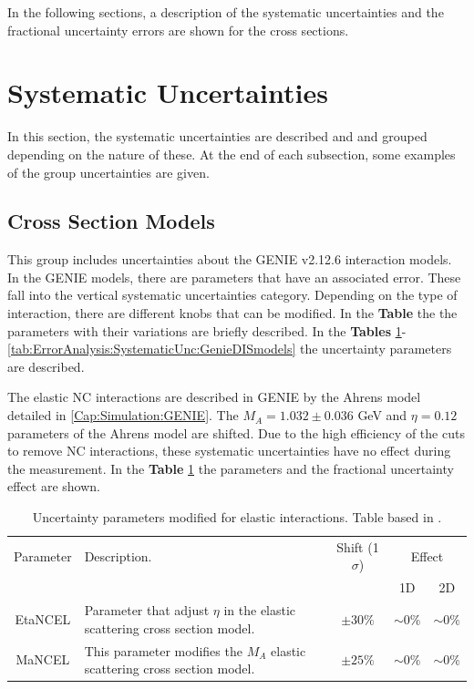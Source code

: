 In the following sections, a description of the systematic uncertainties and the fractional uncertainty errors are shown for the cross sections.

\section{Systematic Uncertainties}
\label{Cap:ErrorAnalysis:SystematicUnc}

In this section, the systematic uncertainties are described and and grouped depending on the nature of these. At the end of each subsection, some examples of the group uncertainties are given.

\subsection{Cross Section Models}
\label{Cap:ErrorAnalysis:SystematicUnc:GenieIntMod}
This group includes uncertainties about the GENIE v2.12.6 interaction models. In the GENIE models, there are parameters that have an associated error. These fall into the vertical systematic uncertainties category. Depending on the type of interaction, there are different knobs that can be modified. In the \textbf{Table} the the parameters with their variations are briefly described. In the \textbf{Tables} \ref{tab:ErrorAnalysis:SystematicUnc:GenieElastic}-\ref{tab:ErrorAnalysis:SystematicUnc:GenieDISmodels} the uncertainty parameters are described. 

The elastic NC interactions are described in GENIE by the Ahrens model \cite{Ahrens:PhysRevD.35.785} detailed in \ref{Cap:Simulation:GENIE}. The $M_A=1.032\pm0.036$ GeV and $\eta=0.12$ parameters of the Ahrens model are shifted. Due to the high efficiency of the cuts to remove NC interactions, these systematic uncertainties have no effect during the measurement. In the \textbf{Table} \ref{tab:ErrorAnalysis:SystematicUnc:GenieElastic} the parameters and the fractional uncertainty effect are shown. 

\begin{table}[!htb]
    \centering
    \begin{tabular}{c|p{2.5in}|c|c|c}
        \hline
        Parameter & Description.  & Shift (1 $\sigma$) & \multicolumn{2}{c}{Effect} \\
         & & & 1D & 2D \\
        \hline 
        EtaNCEL & Parameter that adjust $\eta$ in the elastic scattering  cross section model. & $\pm30\%$ & $\sim0\%$ & $\sim0\%$ \\ \hline
        MaNCEL & This parameter modifies the $M_A$ elastic scattering cross section model. & $\pm25\%$ & $\sim0\%$ & $\sim0\%$ \\ \hline
    \end{tabular}
    \caption{Uncertainty parameters modified for elastic interactions. Table based in \cite{GENIEUnc}.}
    \label{tab:ErrorAnalysis:SystematicUnc:GenieElastic}
\end{table}

